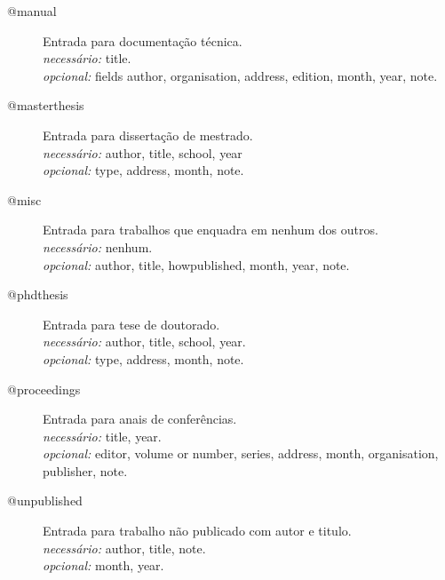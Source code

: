 \begin{description}
\item [@manual] Entrada para documentação técnica. \\
    \textit{necessário:} title. \\
    \textit{opcional:} fields author, organisation, address, edition, 
       month, year, note.

\item [@masterthesis] Entrada para dissertação de mestrado. \\
    \textit{necessário:} author, title, school, year \\
    \textit{opcional:} type, address, month, note.

\item [@misc] Entrada para trabalhos que enquadra em nenhum dos outros. \\
    \textit{necessário:}  nenhum. \\
    \textit{opcional:} author, title, howpublished, month, year, note.

\item [@phdthesis] Entrada para tese de doutorado. \\
    \textit{necessário:} author, title, school, year. \\
    \textit{opcional:} type, address, month, note.

\item [@proceedings] Entrada para anais de conferências. \\
    \textit{necessário:} title, year. \\
    \textit{opcional:} editor, volume or number, series, address, 
      month, organisation, publisher, note.
\item [@unpublished] Entrada para trabalho não publicado com autor e titulo. \\
    \textit{necessário:} author, title, note. \\
    \textit{opcional:} month, year.
\end{description}